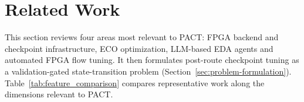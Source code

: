 \documentclass[conference]{IEEEtran}
\begin{document}

\section{Related Work}
\label{sec:related-work}

This section reviews four areas most relevant to PACT: FPGA backend
and checkpoint infrastructure, ECO
optimization, LLM-based EDA agents and automated FPGA flow tuning.
It then formulates post-route checkpoint tuning as a
validation-gated state-transition problem
(Section~\ref{sec:problem-formulation}).
Table~\ref{tab:feature_comparison} compares representative work
along the dimensions relevant to PACT.


\begin{table}[t]
\centering
\caption{Feature comparison of representative FPGA
tuning, backend CAD and EDA-agent work.}
\label{tab:feature_comparison}
\scriptsize
\setlength{\tabcolsep}{1.6pt}
\renewcommand{\arraystretch}{1.05}
\newcommand{\cmark}{$\checkmark$}
\newcommand{\xmark}{--}


\end{table}
\end{document}
